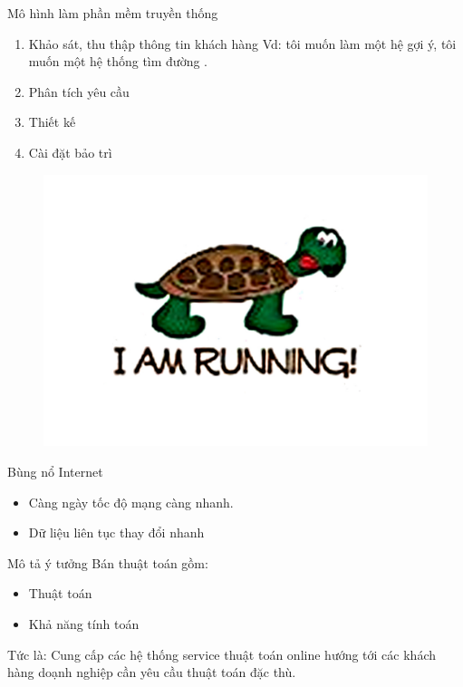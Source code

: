 \documentclass{beamer}
\begin{document}
\begin{frame}{Mô hình làm phần mềm truyền thống}
\begin{enumerate}
\item Khảo sát, thu thập thông tin khách hàng Vd: tôi muốn làm một hệ gợi ý, tôi muốn một hệ thống tìm đường .
\item Phân tích yêu cầu 
\item Thiết kế 
\item Cài đặt bảo trì 
\end{enumerate}
\begin{figure}
\begin{center}
\includegraphics[scale=0.5]{3.jpg}
\end{center}

\end{figure}
\end{frame}
\begin{frame}{Bùng nổ Internet}
\begin{itemize}
\item Càng ngày tốc độ mạng càng nhanh.
\item Dữ liệu liên tục thay đổi nhanh
\end{itemize}

\end{frame}
\begin{frame}{Mô tả ý tưởng}
Bán thuật toán gồm:
\begin{itemize}
\item Thuật toán 
\item Khả năng tính toán 
\end{itemize}
Tức là: Cung cấp các hệ thống service thuật toán online hướng tới các khách hàng doạnh nghiệp cần yêu cầu thuật toán đặc thù.
\end{frame}
\end{document}
